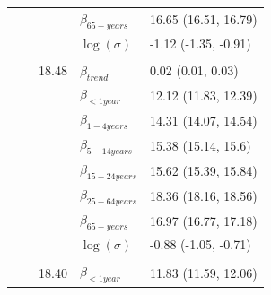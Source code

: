 \documentclass[a4paper,twoside,11pt]{report} %
\theoremstyle{definition}
\theoremstyle{definition}
\theoremstyle{definition}
\theoremstyle{definition}
\theoremstyle{remark}
\begin{document}
\begin{longtable}[t]{llrll}
\hspace{1em}\hspace{1em} &  &  & $\beta_{65+ years}$ & 16.65 (16.51, 16.79)\\

\hspace{1em}\hspace{1em} &  &  & $\log(\sigma)$ & -1.12 (-1.35, -0.91)\\
\cmidrule{2-5}
\addlinespace[0.3em]
\multicolumn{5}{l}{\begin{math}\log(\lambda_{it})=\beta(ageGroup_{i})+\beta_{trend} t +\log(n_{it})\end{math}}\\
\hspace{1em}\hspace{1em} &  & 18.48 & $\beta_{trend}$ & 0.02 (0.01, 0.03)\\

\hspace{1em}\hspace{1em} &  &  & $\beta_{<1 year}$ & 12.12 (11.83, 12.39)\\

\hspace{1em}\hspace{1em} &  &  & $\beta_{1-4 years}$ & 14.31 (14.07, 14.54)\\

\hspace{1em}\hspace{1em} &  &  & $\beta_{5-14 years}$ & 15.38 (15.14, 15.6)\\

\hspace{1em}\hspace{1em} &  &  & $\beta_{15-24 years}$ & 15.62 (15.39, 15.84)\\

\hspace{1em}\hspace{1em} &  &  & $\beta_{25-64 years}$ & 18.36 (18.16, 18.56)\\

\hspace{1em}\hspace{1em} &  &  & $\beta_{65+ years}$ & 16.97 (16.77, 17.18)\\

\hspace{1em}\hspace{1em} &  &  & $\log(\sigma)$ & -0.88 (-1.05, -0.71)\\
\cmidrule{2-5}
\addlinespace[0.3em]
\multicolumn{5}{l}{\begin{math}\log(\lambda_{it})=\beta(ageGroup_{i})+\beta_{\sin}\sin\Big(\frac{\pi\cdot \tau_{t}}{6}\Big) + \beta_{\cos} \cos\Big(\frac{\pi \cdot \tau_{t}}{6}\Big)+\log(n_{it})\end{math}}\\
\hspace{1em}\hspace{1em} &  & 18.40 & $\beta_{<1 year}$ & 11.83 (11.59, 12.06)\\


\end{longtable}
\end{document}
